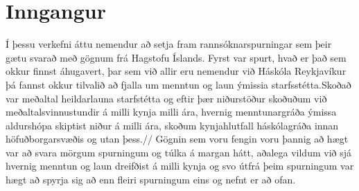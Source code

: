 \documentclass[12pt, git, draft]{rureport}
\begin{document}
\maketitle  %




\section{Inngangur} %

Í þessu verkefni áttu nemendur að setja fram rannsóknarspurningar sem þeir gætu svarað með gögnum frá Hagstofu Íslands. Fyrst var spurt, hvað er það sem okkur finnst áhugavert, þar sem við allir eru nemendur við Háskóla Reykjavíkur þá fannst okkur tilvalið að fjalla um  menntun og laun ýmissia starfsstétta.Skoðað var meðaltal heildarlauna starfstétta og eftir þær niðurstöður skoðuðum við meðaltalsvinnustundir á milli kynja milli ára,  hvernig menntunargráða ýmissa aldurshópa skiptist niður á milli ára, skoðum kynjahlutfall háskólagráða innan höfuðborgarsvæðis og utan þess.//
Gögnin sem voru fengin voru þannig að hægt var að svara mörgum spurningum og túlka á margan hátt, aðalega vildum við sjá hvernig menntun og laun dreifðist á milli kynja og svo útfrá þeim spurningum var hægt að spyrja sig að enn fleiri spurningum eins og nefnt er að ofan.



\end{document}
